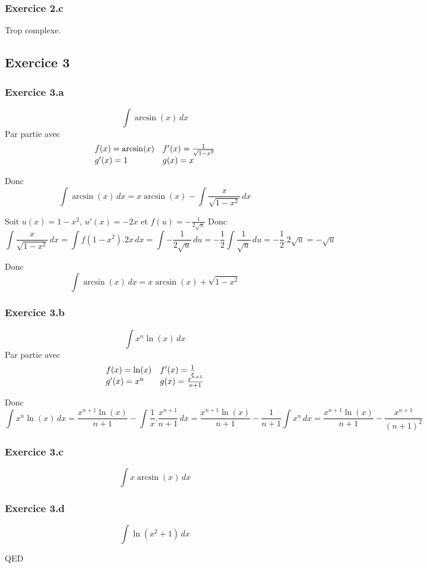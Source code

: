 \documentclass[]{book}
\theoremstyle{definition}
\begin{document}
\subsubsection*{Exercice 2.c}
Trop complexe.

\subsection*{Exercice 3}
\subsubsection*{Exercice 3.a}
$$\int{\arcsin(x)\,dx}$$
Par partie avec
$$
\begin{array}{l l}
f(x) = \arcsin(x) & f'(x)=\frac{1}{\sqrt{1-x^2}} \\
g'(x)= 1 & g(x) = x \\
\end{array}
$$

Donc
$$\int{\arcsin(x)\,dx} = x\arcsin(x) - \int{\frac{x}{\sqrt{1-x^2}}\,dx}$$

Soit $u(x)=1-x^2$, $u'(x)=-2x$ et $f(u)=-\frac{1}{2\sqrt{u}}$
Donc
$$\int{\frac{x}{\sqrt{1-x^2}}\,dx} = \int{f(1-x^2).2x\,dx} = \int{-\frac{1}{2\sqrt{u}}\,du} = -\frac{1}{2}\int{\frac{1}{\sqrt{u}}\,du} = -\frac{1}{2}.2\sqrt{u} = -\sqrt{u}$$

Donc
$$\int{\arcsin(x)\,dx} = x\arcsin(x) + \sqrt{1-x^2}$$

\subsubsection*{Exercice 3.b}
$$\int{x^n\ln(x)\,dx}$$
Par partie avec
$$
\begin{array}{l l}
f(x) = \ln(x) & f'(x)=\frac{1}{x} \\
g'(x)= x^n & g(x) = \frac{x^{n+1}}{n+1} \\
\end{array}
$$

Donc
$$\int{x^n\ln(x)\,dx} = \frac{x^{n+1}\ln(x)}{n+1} - \int{\frac{1}{x}.\frac{x^{n+1}}{n+1}\,dx} = \frac{x^{n+1}\ln(x)}{n+1} - \frac{1}{n+1}\int{x^n\,dx} = \frac{x^{n+1}\ln(x)}{n+1} - \frac{x^{n+1}}{(n+1)^2}$$


\subsubsection*{Exercice 3.c}
$$\int{x\arcsin(x)\,dx}$$

\subsubsection*{Exercice 3.d}
$$\int{\ln(x^2+1)\,dx}$$

QED
\end{document}
